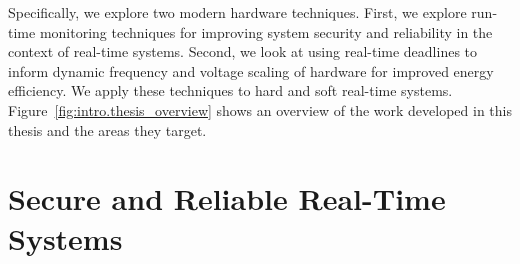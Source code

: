Specifically, we explore two modern hardware techniques. First, we explore
run-time monitoring techniques for improving system security and reliability in
the context of real-time systems. Second, we look at using real-time deadlines
to inform dynamic frequency and voltage scaling of hardware for improved energy efficiency.
We apply these techniques to hard and soft real-time systems.
Figure~\ref{fig:intro.thesis_overview} shows an overview of the work developed
in this thesis and the areas they target.

% 

\section{Secure and Reliable Real-Time Systems}
\label{sec:intro.security}

